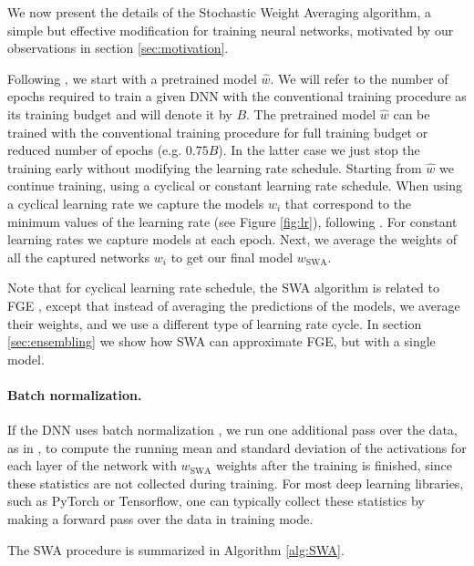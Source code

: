 \documentclass[letterpaper]{article}
\begin{document}
We now present the details of the Stochastic Weight Averaging algorithm, 
a simple but effective modification for training neural networks, motivated by
our observations in section \ref{sec:motivation}.

Following \citet{garipov2018}, we start with a pretrained model $\hat w$. 
We will refer to the number of epochs required to train a given DNN
with the conventional training procedure as its training budget and will
denote it by $B$.
The pretrained model $\hat w$ can be trained with the conventional training 
procedure for full training budget or reduced number of epochs (e.g. $0.75 B$).
In the latter case we just stop the training early without modifying the 
learning rate schedule.
Starting from $\hat w$ we continue
training, using a cyclical or constant learning rate schedule. 
When using a cyclical learning rate we capture the 
models $w_i$ that correspond to the minimum values of the learning rate 
(see Figure \ref{fig:lr}), following \citet{garipov2018}. For constant 
learning rates we capture models at each epoch.
Next, we average the weights of all the captured networks $w_i$
to get our final model $w_{\text{SWA}}$. 

Note that for cyclical learning rate schedule, the SWA algorithm is 
related to FGE \citep{garipov2018}, except that instead of
averaging the predictions of the models, we average their weights,
and we use a different type of learning rate cycle.
In section \ref{sec:ensembling} we show how SWA can approximate
FGE, but with a single model.

\paragraph{Batch normalization.} If the DNN uses batch normalization \citep{ioffe2015}, we 
run one additional pass over the data, as in \citet{garipov2018}, to compute the running mean 
and standard deviation of 
the activations for each layer of the network with $w_{\text{SWA}}$ weights after the training is 
finished, since these statistics are not collected during training. For most deep learning libraries,
such as PyTorch or Tensorflow, one can typically collect these statistics by making a forward pass 
over the data in training mode.

The SWA procedure is summarized in Algorithm \ref{alg:SWA}.
\end{document}
